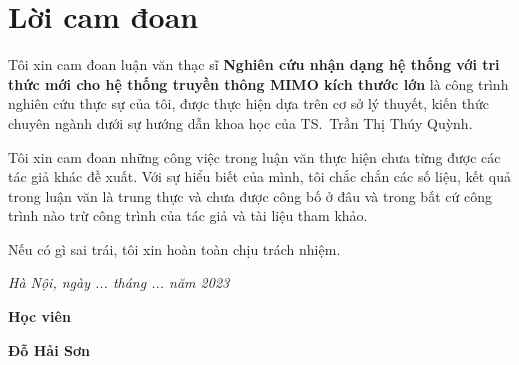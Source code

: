\clearpage
{}

\chapter*{Lời cam đoan}

Tôi xin cam đoan luận văn thạc sĩ \textbf{Nghiên cứu nhận dạng hệ thống với tri thức mới cho hệ thống truyền thông MIMO kích thước lớn} là công trình nghiên cứu thực sự của tôi, được thực hiện dựa trên cơ sở lý thuyết, kiến thức chuyên ngành dưới sự hướng dẫn khoa học của TS.~Trần Thị Thúy Quỳnh.

Tôi xin cam đoan những công việc trong luận văn thực hiện chưa từng được các tác giả khác đề xuất. Với sự hiểu biết của mình, tôi chắc chắn các số liệu, kết quả trong luận văn là trung thực và chưa được công bố ở đâu và trong bất cứ công trình nào trừ công trình của tác giả và tài liệu tham khảo.

Nếu có gì sai trái, tôi xin hoàn toàn chịu trách nhiệm.

\vspace{1cm}
\hspace{7cm}\textit{Hà Nội, ngày ... tháng ... năm 2023}

\hspace{9.4cm}\textbf{Học viên}
\vspace{2.5cm}


\hspace{9.3cm}\textbf{Đỗ Hải Sơn}